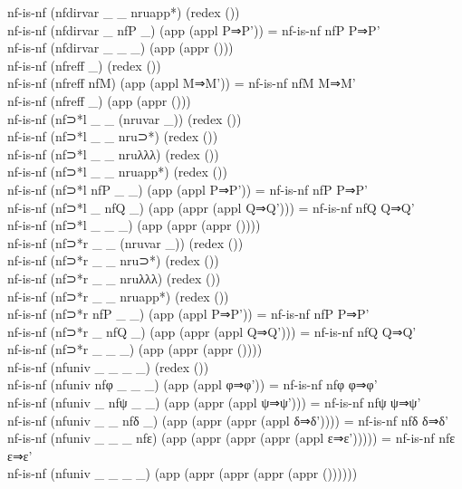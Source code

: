 {\begin{code}
{\>nf-is-nf (nfdirvar \_ \_ nruapp*) (redex ())\<\\
\>nf-is-nf (nfdirvar \_ nfP \_) (app (appl P⇒P')) = nf-is-nf nfP P⇒P'\<\\
\>nf-is-nf (nfdirvar \_ \_ \_) (app (appr ()))\<\\
\>nf-is-nf (nfreff \_) (redex ())\<\\
\>nf-is-nf (nfreff nfM) (app (appl M⇒M')) = nf-is-nf nfM M⇒M'\<\\
\>nf-is-nf (nfreff \_) (app (appr ()))\<\\
\>nf-is-nf (nf⊃*l \_ \_ (nruvar \_)) (redex ()) \<\\
\>nf-is-nf (nf⊃*l \_ \_ nru⊃*) (redex ()) \<\\
\>nf-is-nf (nf⊃*l \_ \_ nruλλλ) (redex ()) \<\\
\>nf-is-nf (nf⊃*l \_ \_ nruapp*) (redex ()) \<\\
\>nf-is-nf (nf⊃*l nfP \_ \_) (app (appl P⇒P')) = nf-is-nf nfP P⇒P'\<\\
\>nf-is-nf (nf⊃*l \_ nfQ \_) (app (appr (appl Q⇒Q'))) = nf-is-nf nfQ Q⇒Q'\<\\
\>nf-is-nf (nf⊃*l \_ \_ \_) (app (appr (appr ())))\<\\
\>nf-is-nf (nf⊃*r \_ \_ (nruvar \_)) (redex ()) \<\\
\>nf-is-nf (nf⊃*r \_ \_ nru⊃*) (redex ()) \<\\
\>nf-is-nf (nf⊃*r \_ \_ nruλλλ) (redex ()) \<\\
\>nf-is-nf (nf⊃*r \_ \_ nruapp*) (redex ()) \<\\
\>nf-is-nf (nf⊃*r nfP \_ \_) (app (appl P⇒P')) = nf-is-nf nfP P⇒P'\<\\
\>nf-is-nf (nf⊃*r \_ nfQ \_) (app (appr (appl Q⇒Q'))) = nf-is-nf nfQ Q⇒Q'\<\\
\>nf-is-nf (nf⊃*r \_ \_ \_) (app (appr (appr ())))\<\\
\>nf-is-nf (nfuniv \_ \_ \_ \_) (redex ())\<\\
\>nf-is-nf (nfuniv nfφ \_ \_ \_) (app (appl φ⇒φ')) = nf-is-nf nfφ φ⇒φ'\<\\
\>nf-is-nf (nfuniv \_ nfψ \_ \_) (app (appr (appl ψ⇒ψ'))) = nf-is-nf nfψ ψ⇒ψ'\<\\
\>nf-is-nf (nfuniv \_ \_ nfδ \_) (app (appr (appr (appl δ⇒δ')))) = nf-is-nf nfδ δ⇒δ'\<\\
\>nf-is-nf (nfuniv \_ \_ \_ nfε) (app (appr (appr (appr (appl ε⇒ε'))))) = nf-is-nf nfε ε⇒ε'\<\\
\>nf-is-nf (nfuniv \_ \_ \_ \_) (app (appr (appr (appr (appr ())))))\<\\
}
\end{code}}
